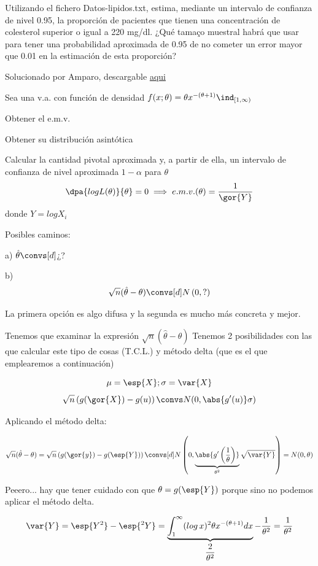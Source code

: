 \begin{problem}[4]
\ppart Utilizando el fichero Datos-lipidos.txt, estima, mediante un intervalo de confianza de nivel
0.95, la proporción de pacientes que tienen una concentración de colesterol superior o igual a
220 mg/dl. ¿Qué tamaço muestral habrá que usar para tener una probabilidad aproximada de 0.95 de no cometer un error mayor que 0.01 en la estimación de esta proporción?

\ppart
\solution
Solucionado por Amparo, descargable 
\href{http://www.uam.es/personal_pdi/ciencias/abaillo/MatEstI/T4DatosLipidos.pdf}{aqui}
\end{problem}
\begin{problem}[5] Sea una v.a. con función de densidad $f(x;\theta) = \theta x^{-(\theta + 1)}\ind_{[1,\infty)} $

\ppart Obtener el e.m.v.

\ppart Obtener su distribución asintótica

\ppart Calcular la cantidad pivotal aproximada y, a partir de ella, un intervalo de confianza de nivel aproximada $1-\alpha$ para $\theta$
\solution
\spart \[\dpa{logL(\theta)}{\theta} = 0 \implies e.m.v.(\theta) = \frac{1}{\gor{Y}}\]
donde $Y = log X_i$

\spart Posibles caminos:

a) $\hat{\theta} \convs[d] $¿?

b) \[\sqrt{n}(\hat{\theta} - \theta) \convs[d] N\left(0,?\right)\]

La primera opción es algo difusa y la segunda es mucho más concreta y mejor.

Tenemos que examinar la expresión $\sqrt{n}(\hat{\theta} - \theta)$
Tenemos 2 posibilidades con las que calcular este tipo de cosas (T.C.L.) y método delta (que es el que emplearemos a continuación)

\[ \mu = \esp{X}; \sigma = \var{X} \]
\[ \sqrt{n}\left(g(\gor{X}) - g(u)\right) \convs N(0,\abs{g'(u)} \sigma) \]

Aplicando el método delta:

\[
\sqrt{n}(\hat{\theta} - \theta) = \sqrt{ n}\left(g(\gor{y})-g(\esp{Y})\right)\convs[d] N\left(0,\underbrace{\abs{g'\left(\frac{1}{\theta}\right)}}_{\theta^2} \sqrt{\var{Y}}\right) = N(0,\theta)
\]

Peeero... hay que tener cuidado con que $\theta = g(\esp{Y})$ porque sino no podemos aplicar el método delta.

\[
\var{Y} = \esp{Y^2} - \esp{^2 Y} = \underbrace{\int_1^{\infty} (log\,x)^2 \theta x^{-(\theta + 1)}dx}_{\displaystyle\frac{2}{\theta^2}} - \frac{1}{\theta^2} = \frac{1}{\theta^2}
\]


\end{problem}
